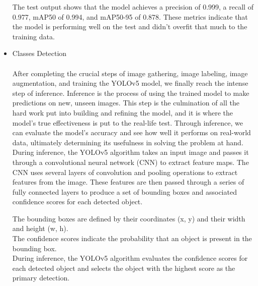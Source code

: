 \begin{itemize}
\begin{table}[h]

\centering
{}


\end{table}

\FloatBarrier
The test output shows that the model achieves a precision of 0.999, a recall of 0.977, mAP50 of 0.994, and mAP50-95 of 0.878. These metrics indicate that the model is performing well on the test and didn't overfit that much to the training data.

\item{Classes Detection}\\
\\
After completing the crucial steps of image gathering, image labeling, image augmentation, and training the YOLOv5 model, we finally reach the intense step of inference. Inference is the process of using the trained model to make predictions on new, unseen images. This step is the culmination of all the hard work put into building and refining the model, and it is where the model's true effectiveness is put to the real-life test. Through inference, we can evaluate the model's accuracy and see how well it performs on real-world data, ultimately determining its usefulness in solving the problem at hand.\cite{PS19}\\
During inference, the YOLOv5 algorithm takes an input image and passes it through a convolutional neural network (CNN) to extract feature maps. The CNN uses several layers of convolution and pooling operations to extract features from the image. These features are then passed through a series of fully connected layers to produce a set of bounding boxes and associated confidence scores for each detected object.

The bounding boxes are defined by their coordinates (x, y) and their width and height (w, h).
\\
The confidence scores indicate the probability that an object is present in the bounding box.
\\
During inference, the YOLOv5 algorithm evaluates the confidence scores for each detected object and selects the object with the highest score as the primary detection.


\end{itemize}
